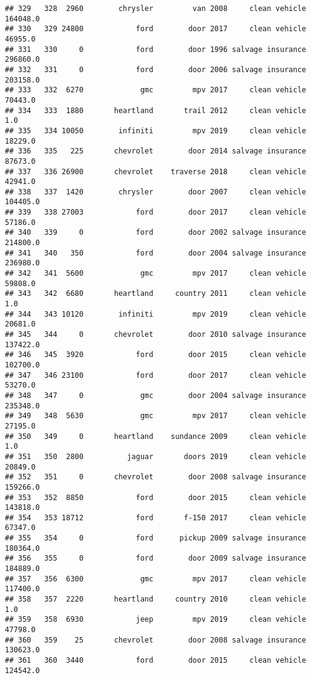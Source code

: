 \documentclass[
]{article}
\begin{document}
\begin{verbatim}
## 329   328  2960        chrysler         van 2008     clean vehicle  164048.0
## 330   329 24800            ford        door 2017     clean vehicle   46955.0
## 331   330     0            ford        door 1996 salvage insurance  296860.0
## 332   331     0            ford        door 2006 salvage insurance  203158.0
## 333   332  6270             gmc         mpv 2017     clean vehicle   70443.0
## 334   333  1880       heartland       trail 2012     clean vehicle       1.0
## 335   334 10050        infiniti         mpv 2019     clean vehicle   18229.0
## 336   335   225       chevrolet        door 2014 salvage insurance   87673.0
## 337   336 26900       chevrolet    traverse 2018     clean vehicle   42941.0
## 338   337  1420        chrysler        door 2007     clean vehicle  104405.0
## 339   338 27003            ford        door 2017     clean vehicle   57186.0
## 340   339     0            ford        door 2002 salvage insurance  214800.0
## 341   340   350            ford        door 2004 salvage insurance  236980.0
## 342   341  5600             gmc         mpv 2017     clean vehicle   59808.0
## 343   342  6680       heartland     country 2011     clean vehicle       1.0
## 344   343 10120        infiniti         mpv 2019     clean vehicle   20681.0
## 345   344     0       chevrolet        door 2010 salvage insurance  137422.0
## 346   345  3920            ford        door 2015     clean vehicle  102700.0
## 347   346 23100            ford        door 2017     clean vehicle   53270.0
## 348   347     0             gmc        door 2004 salvage insurance  235348.0
## 349   348  5630             gmc         mpv 2017     clean vehicle   27195.0
## 350   349     0       heartland    sundance 2009     clean vehicle       1.0
## 351   350  2800          jaguar       doors 2019     clean vehicle   20849.0
## 352   351     0       chevrolet        door 2008 salvage insurance  159266.0
## 353   352  8850            ford        door 2015     clean vehicle  143818.0
## 354   353 18712            ford       f-150 2017     clean vehicle   67347.0
## 355   354     0            ford      pickup 2009 salvage insurance  180364.0
## 356   355     0            ford        door 2009 salvage insurance  184889.0
## 357   356  6300             gmc         mpv 2017     clean vehicle  117400.0
## 358   357  2220       heartland     country 2010     clean vehicle       1.0
## 359   358  6930            jeep         mpv 2019     clean vehicle   47798.0
## 360   359    25       chevrolet        door 2008 salvage insurance  130623.0
## 361   360  3440            ford        door 2015     clean vehicle  124542.0

\end{verbatim}
\end{document}
